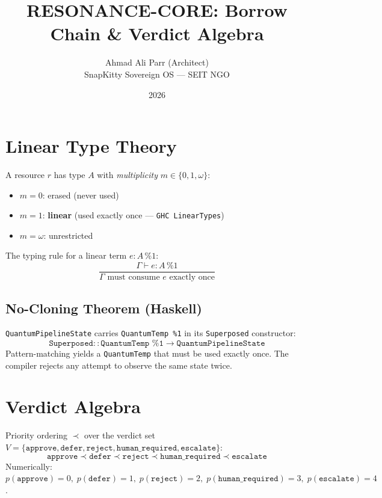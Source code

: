 \documentclass{article}
\title{RESONANCE-CORE: Borrow Chain \& Verdict Algebra}
\author{Ahmad Ali Parr (Architect) \\ SnapKitty Sovereign OS --- SEIT NGO}
\date{2026}
\begin{document}
\maketitle

\section{Linear Type Theory}
A resource $r$ has type $A$ with \emph{multiplicity} $m \in \{0, 1, \omega\}$:
\begin{itemize}
  \item $m = 0$: erased (never used)
  \item $m = 1$: \textbf{linear} (used exactly once --- \texttt{GHC LinearTypes})
  \item $m = \omega$: unrestricted
\end{itemize}

The typing rule for a linear term $e : A\, \%1$:
\begin{equation}
  \frac{\Gamma \vdash e : A\, \%1}{\Gamma \text{ must consume } e \text{ exactly once}}
\end{equation}

\subsection{No-Cloning Theorem (Haskell)}
\texttt{QuantumPipelineState} carries \texttt{QuantumTemp \%1} in its \texttt{Superposed} constructor:
\begin{equation}
  \texttt{Superposed} :: \texttt{QuantumTemp \%1} \to \texttt{QuantumPipelineState}
\end{equation}
Pattern-matching yields a \texttt{QuantumTemp} that must be used exactly once. The compiler rejects any attempt to observe the same state twice.

\section{Verdict Algebra}
Priority ordering $\prec$ over the verdict set $V = \{\texttt{approve}, \texttt{defer}, \texttt{reject}, \texttt{human\_required}, \texttt{escalate}\}$:
\begin{equation}
  \texttt{approve} \prec \texttt{defer} \prec \texttt{reject} \prec \texttt{human\_required} \prec \texttt{escalate}
\end{equation}
Numerically: $p(\texttt{approve}) = 0,\; p(\texttt{defer}) = 1,\; p(\texttt{reject}) = 2,\; p(\texttt{human\_required}) = 3,\; p(\texttt{escalate}) = 4$.
\end{document}
